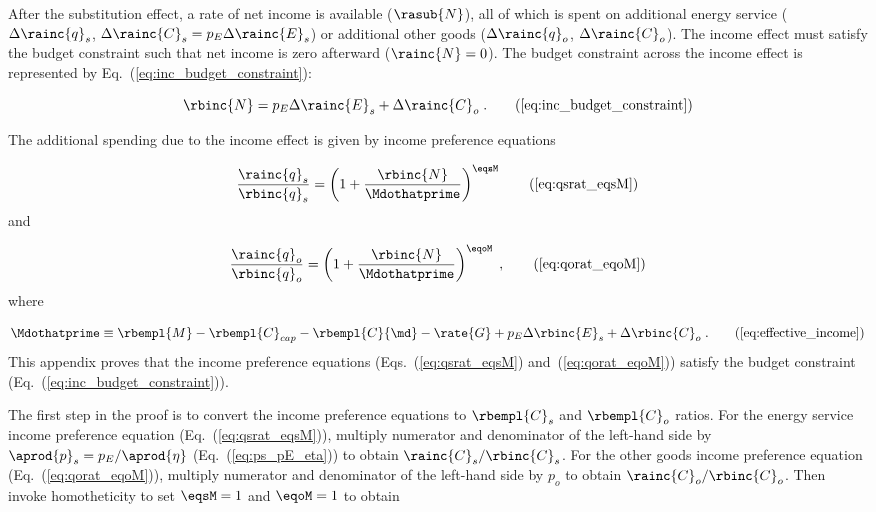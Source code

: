 

After the substitution effect, 
a rate of net income is available ($\rasub{N}$), 
all of which is spent on
additional energy service ($\Delta \rainc{q}_s$, $\Delta \rainc{C}_s = p_E \Delta \rainc{E}_s$) or 
additional other goods ($\Delta \rainc{q}_o$, $\Delta \rainc{C}_o$).
The income effect must satisfy the budget constraint
such that net income is zero afterward ($\rainc{N} = 0$).
The budget constraint across the income effect 
is represented by Eq.~(\ref{eq:inc_budget_constraint}): 

\begin{equation}
  \rbinc{N} = p_E \Delta \rainc{E}_s + \Delta \rainc{C}_o \; . \tag{\ref{eq:inc_budget_constraint}}
\end{equation}

The additional spending due to the income effect is given by income preference equations

\begin{equation}
  \frac{\rainc{q}_s}{\rbinc{q}_s} = \left( 1 + \frac{\rbinc{N}}{\Mdothatprime}  \right) ^{\eqsM} 
                                                                \tag{\ref{eq:qsrat_eqsM}}
\end{equation}
%
and

\begin{equation}
  \frac{\rainc{q}_o}{\rbinc{q}_o} = \left( 1 + \frac{\rbinc{N}}{\Mdothatprime}  \right) ^{\eqoM} \; ,
                                                                \tag{\ref{eq:qorat_eqoM}}
\end{equation}
%
where

\begin{equation}
  \Mdothatprime \equiv \rbempl{M} - \rbempl{C}_{cap} - \rbempl{C}{\md} 
                       - \rate{G} + p_E \Delta \rbinc{E}_s + \Delta \rbinc{C}_o \; .
                                                                \tag{\ref{eq:effective_income}}
\end{equation}
%
This appendix proves that the income preference equations 
(Eqs.~(\ref{eq:qsrat_eqsM}) and~(\ref{eq:qorat_eqoM}))
satisfy the budget constraint (Eq.~(\ref{eq:inc_budget_constraint})).

The first step in the proof is to convert 
the income preference equations
to $\rbempl{C}_s$ and $\rbempl{C}_o$ ratios.
For the energy service income preference equation (Eq.~(\ref{eq:qsrat_eqsM})), 
multiply numerator and denominator of the left-hand side by $\aprod{p}_s = p_E / \aprod{\eta}$
(Eq.~(\ref{eq:ps_pE_eta}))
to obtain $\rainc{C}_s / \rbinc{C}_s$.
For the other goods income preference equation (Eq.~(\ref{eq:qorat_eqoM})), 
multiply numerator and denominator of the left-hand side by $p_o$
to obtain $\rainc{C}_o / \rbinc{C}_o$.
Then invoke homotheticity to set $\eqsM = 1$ and $\eqoM = 1$ to obtain

